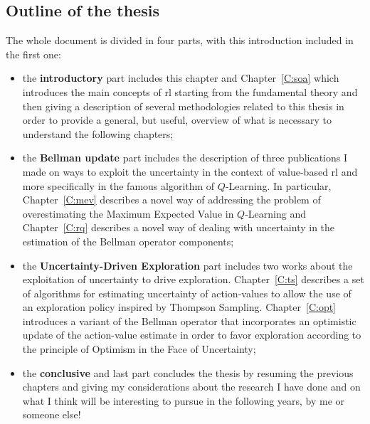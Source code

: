 \subsection{Outline of the thesis}
The whole document is divided in four parts, with this introduction included in the first one:
\begin{itemize}
 \item the \textbf{introductory} part includes this chapter and Chapter~\ref{C:soa} which introduces the main concepts of \gls{rl} starting from the fundamental theory and then giving a description of several methodologies related to this thesis in order to provide a general, but useful, overview of what is necessary to understand the following chapters;
 \item the \textbf{Bellman update} part includes the description of three publications I made on ways to exploit the uncertainty in the context of value-based \gls{rl} and more specifically in the famous algorithm of $Q$-Learning. In particular, Chapter~\ref{C:mev} describes a novel way of addressing the problem of overestimating the Maximum Expected Value in $Q$-Learning and Chapter~\ref{C:rq} describes a novel way of dealing with uncertainty in the estimation of the Bellman operator components;
 \item the \textbf{Uncertainty-Driven Exploration} part includes two works about the exploitation of uncertainty to drive exploration. Chapter~\ref{C:ts} describes a set of algorithms for estimating uncertainty of action-values to allow the use of an exploration policy inspired by Thompson Sampling. Chapter~\ref{C:opt} introduces a variant of the Bellman operator that incorporates an optimistic update of the action-value estimate in order to favor exploration according to the principle of Optimism in the Face of Uncertainty;
 \item the \textbf{conclusive} and last part concludes the thesis by resuming the previous chapters and giving my considerations about the research I have done and on what I think will be interesting to pursue in the following years, by me or someone else!
\end{itemize}
